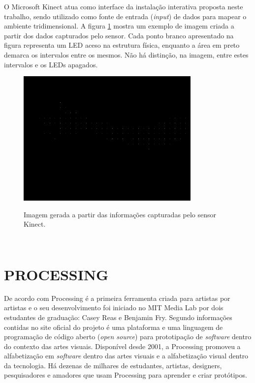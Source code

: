 O Microsoft Kinect atua como interface da instalação interativa proposta neste trabalho, sendo utilizado como fonte de entrada (\textit{input}) de dados para mapear o ambiente tridimensional. A figura \ref{fig:kinect_exemplo} mostra um exemplo de imagem criada a partir dos dados capturados pelo sensor. Cada ponto branco apresentado na figura representa um LED aceso na estrutura física, enquanto a área em preto demarca os intervalos entre os mesmos. Não há distinção, na imagem, entre estes intervalos e os LEDs apagados. 

\begin{figure}[H]
    \centering
    \caption{Imagem gerada a partir  das informações capturadas  pelo sensor Kinect.}
	\vspace*{0,2cm}
    \includegraphics[width=0.8\textwidth]{./04-figuras/kinect_exemplo}
    \label{fig:kinect_exemplo}
\end{figure}
\vspace*{-0,9cm}
{\raggedright {}}\\


\section{PROCESSING}

De acordo com  Processing é a primeira ferramenta criada para artistas por artistas e o seu desenvolvimento foi iniciado no MIT Media Lab por dois estudantes de graduação: Casey Reas e Benjamin Fry. Segundo informações contidas no site oficial do projeto  é uma plataforma e uma linguagem de programação de código aberto (\textit{open source}) para prototipação de \textit{software} dentro do contexto das artes visuais. Disponível desde 2001, a Processing promoveu a alfabetização em \textit{software} dentro das artes visuais e a alfabetização visual dentro da tecnologia. Há dezenas de milhares de estudantes, artistas, designers, pesquisadores e amadores que usam Processing para aprender e criar protótipos.

